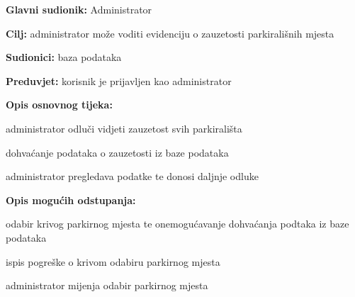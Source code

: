     				\noindent {}
    				\begin{packed_item}
    					
    					\item \textbf{Glavni sudionik:} Administrator
    					\item  \textbf{Cilj:} administrator može voditi evidenciju o zauzetosti parkirališnih mjesta
    					\item  \textbf{Sudionici:} baza podataka
    					\item  \textbf{Preduvjet:} korisnik je prijavljen kao administrator
    					\item  \textbf{Opis osnovnog tijeka:}
    					
    					\item[] \begin{packed_enum}
    						
    						\item administrator odluči vidjeti zauzetost svih parkirališta
    						\item dohvaćanje podataka o zauzetosti iz baze podataka
    						\item administrator pregledava podatke te donosi daljnje odluke
    					\end{packed_enum}
    					
    					\item  \textbf{Opis mogućih odstupanja:}
    					
    					\item[] \begin{packed_item}
    						
    						\item[2.a] odabir krivog parkirnog mjesta te onemogućavanje dohvaćanja podtaka iz baze podataka
    						\item[] \begin{packed_enum}
    							
    							\item ispis pogreške o krivom odabiru parkirnog mjesta
    							\item administrator mijenja odabir parkirnog mjesta
    							
    						\end{packed_enum}
    						
    					\end{packed_item}
    				\end{packed_item}
    				\noindent {}
